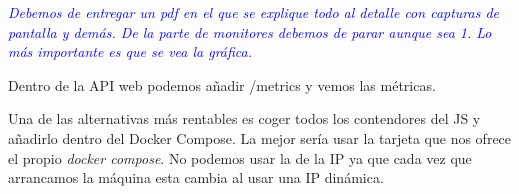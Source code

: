 \textcolor{blue}{\textit{Debemos de entregar un pdf en el que se explique todo al detalle con capturas de pantalla y demás. De la parte de monitores debemos de parar aunque sea 1. Lo más importante es que se vea la gráfica.}}

Dentro de la API web podemos añadir /metrics y vemos las métricas.

Una de las alternativas más rentables es coger todos los contendores del JS y añadirlo dentro del Docker Compose. La mejor sería usar la tarjeta que nos ofrece el propio \textit{docker compose}. No podemos usar la de la IP ya que cada vez que arrancamos la máquina esta cambia al usar una IP dinámica.



